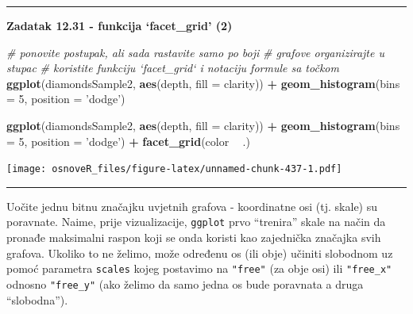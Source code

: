 \documentclass[]{book}
\newenvironment{Shaded}{\begin{snugshade}}{\end{snugshade}}
\newcommand{\KeywordTok}[1]{\textcolor[rgb]{0.13,0.29,0.53}{\textbf{#1}}}
\newcommand{\DataTypeTok}[1]{\textcolor[rgb]{0.13,0.29,0.53}{#1}}
\newcommand{\DecValTok}[1]{\textcolor[rgb]{0.00,0.00,0.81}{#1}}
\newcommand{\StringTok}[1]{\textcolor[rgb]{0.31,0.60,0.02}{#1}}
\newcommand{\CommentTok}[1]{\textcolor[rgb]{0.56,0.35,0.01}{\textit{#1}}}
\newcommand{\OperatorTok}[1]{\textcolor[rgb]{0.81,0.36,0.00}{\textbf{#1}}}
\newcommand{\NormalTok}[1]{#1}
\theoremstyle{definition}
\theoremstyle{definition}
\theoremstyle{definition}
\theoremstyle{remark}
\begin{document}
\begin{center}\rule{0.5\linewidth}{\linethickness}\end{center}

\textbf{Zadatak 12.31 - funkcija `facet\_grid' (2)}

\begin{Shaded}
\begin{Highlighting}[]
\CommentTok{# ponovite postupak, ali sada rastavite samo po boji}
\CommentTok{# grafove organizirajte u stupac}
\CommentTok{# koristite funkciju `facet_grid` i notaciju formule sa točkom}
\KeywordTok{ggplot}\NormalTok{(diamondsSample2, }\KeywordTok{aes}\NormalTok{(depth, }\DataTypeTok{fill =}\NormalTok{ clarity)) }\OperatorTok{+}\StringTok{ }
\StringTok{  }\KeywordTok{geom_histogram}\NormalTok{(}\DataTypeTok{bins =} \DecValTok{5}\NormalTok{,  }\DataTypeTok{position =} \StringTok{'dodge'}\NormalTok{)}
\end{Highlighting}
\end{Shaded}

\begin{Shaded}
\begin{Highlighting}[]
\KeywordTok{ggplot}\NormalTok{(diamondsSample2, }\KeywordTok{aes}\NormalTok{(depth, }\DataTypeTok{fill =}\NormalTok{ clarity)) }\OperatorTok{+}\StringTok{ }
\StringTok{  }\KeywordTok{geom_histogram}\NormalTok{(}\DataTypeTok{bins =} \DecValTok{5}\NormalTok{,  }\DataTypeTok{position =} \StringTok{'dodge'}\NormalTok{) }\OperatorTok{+}\StringTok{ }\KeywordTok{facet_grid}\NormalTok{(color }\OperatorTok{~}\StringTok{ }\NormalTok{.)}
\end{Highlighting}
\end{Shaded}

\texttt{[image: osnoveR\_files/figure-latex/unnamed-chunk-437-1.pdf]}

\begin{center}\rule{0.5\linewidth}{\linethickness}\end{center}

Uočite jednu bitnu značajku uvjetnih grafova - koordinatne osi (tj.
skale) su poravnate. Naime, prije vizualizacije, \texttt{ggplot} prvo
``trenira'' skale na način da pronađe maksimalni raspon koji se onda
koristi kao zajednička značajka svih grafova. Ukoliko to ne želimo, može
određenu os (ili obje) učiniti slobodnom uz pomoć parametra
\texttt{scales} kojeg postavimo na \texttt{"free"} (za obje osi) ili
\texttt{"free\_x"} odnosno \texttt{"free\_y"} (ako želimo da samo jedna
os bude poravnata a druga ``slobodna'').
\end{document}

